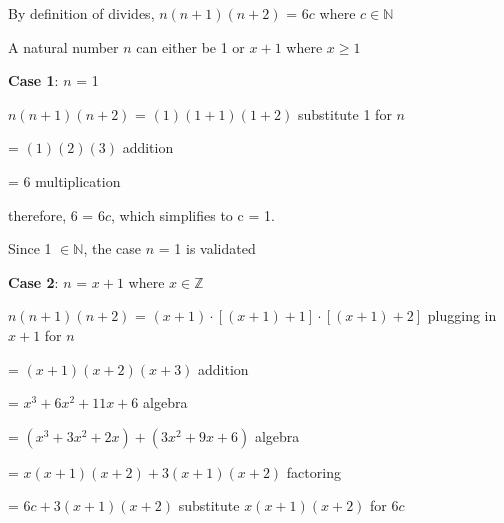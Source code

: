 \documentclass{article} %
\begin{document}
    \vspace*{0.08cm}

    By definition of divides, $n(n + 1)(n + 2)$ = 6$c$ where $c \in \mathbb{N}$

    A natural number $n$ can either be 1 or $x+1$ where $x \geq 1$

    \vspace*{0.2cm}

    \textbf{Case 1}: $n$ = 1

    \tabto*{1cm}$n(n + 1)(n + 2)$ = $(1)(1 + 1)(1 + 2)$ \tabto*{7.3cm}substitute 1 for $n$

    \vspace*{0.08cm}

    \tabto*{1cm}\tabto*{3.51cm} = $(1)(2)(3)$ \tabto*{7.3cm}addition
    
    \vspace*{0.08cm}

    \tabto*{1cm}\tabto*{3.51cm} = $6$ \tabto*{7.3cm}multiplication
    
    \vspace*{0.08cm}

    \tabto*{1cm}therefore, 6 = 6$c$, which simplifies to c = 1.

    \tabto*{1cm}Since 1 $\in \mathbb{N}$, the case $n$ = 1 is validated

    \vspace*{0.2cm}
    
    \textbf{Case 2}: $n$ = $x + 1$ where $x \in \mathbb{Z}$
    \vspace*{0.08cm}

    \tabto*{1cm}$n(n + 1)(n + 2)$ = $(x + 1)\cdot [(x + 1) + 1]\cdot [(x + 1) + 2]$ \tabto*{9.6cm}plugging in $x+1$ for $n$
    \vspace*{0.08cm}

    \tabto*{3.51cm} = $(x + 1)(x + 2)(x + 3)$ \tabto*{9.6cm}addition
    \vspace*{0.08cm}

    \tabto*{3.51cm} = $x^3 + 6x^2 + 11x + 6$ \tabto*{9.6cm}algebra
    \vspace*{0.08cm}

    \tabto*{3.51cm} = $(x^3 +3x^2 + 2x) + (3x^2 + 9x + 6)$ \tabto*{9.6cm}algebra
    \vspace*{0.08cm}

    \tabto*{3.51cm} = $x(x+1)(x+2) + 3(x+1)(x+2)$ \tabto*{9.6cm}factoring
    \vspace*{0.08cm}

    \tabto*{3.51cm} = $6c + 3(x+1)(x+2)$ \tabto*{9.6cm}substitute $x(x+1)(x+2)$ for $6c$
    \vspace*{0.08cm}
\end{document}

